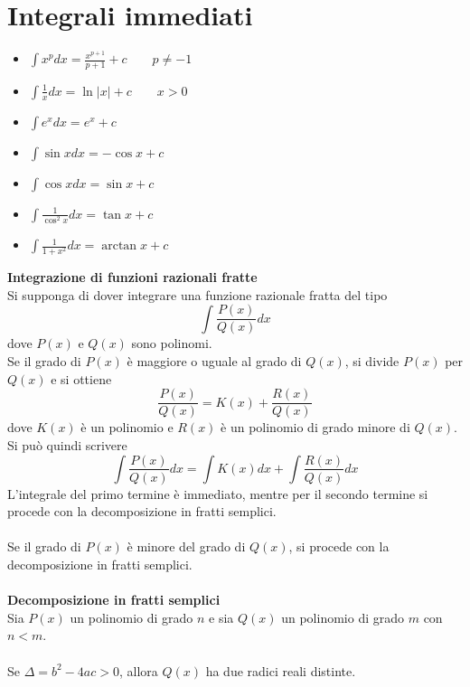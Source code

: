 \documentclass{article}
\begin{document}
\section*{Integrali immediati}
\begin{itemize}
    \item $\int x^pdx = \frac{x^{p+1}}{p+1}+c \qquad p \neq -1$
    \item $\int \frac{1}{x}dx = \ln|x|+c \qquad x>0$
    \item $\int e^xdx = e^x+c$
    \item $\int \sin xdx = -\cos x+c$
    \item $\int \cos xdx = \sin x+c$
    \item $\int \frac{1}{\cos^2x}dx = \tan x+c$
    \item $\int \frac{1}{1+x^2}dx = \arctan x+c$
\end{itemize}
\textbf{Integrazione di funzioni razionali fratte}\\
Si supponga di dover integrare una funzione razionale fratta del tipo
\begin{equation*}
    \int \frac{P(x)}{Q(x)}dx
\end{equation*}
dove $P(x)$ e $Q(x)$ sono polinomi.\\
Se il grado di $P(x)$ è maggiore o uguale al grado di $Q(x)$, si divide $P(x)$ per $Q(x)$ e si ottiene
\begin{equation*}
    \frac{P(x)}{Q(x)} = K(x) + \frac{R(x)}{Q(x)}
\end{equation*}
dove $K(x)$ è un polinomio e $R(x)$ è un polinomio di grado minore di $Q(x)$.\\
Si può quindi scrivere
\begin{equation*}
    \int \frac{P(x)}{Q(x)}dx = \int K(x)dx + \int \frac{R(x)}{Q(x)}dx
\end{equation*}
L'integrale del primo termine è immediato, mentre per il secondo termine si procede con la decomposizione in fratti semplici.\\\\
Se il grado di $P(x)$ è minore del grado di $Q(x)$, si procede con la decomposizione in fratti semplici.\\\\
\textbf{Decomposizione in fratti semplici}\\
Sia $P(x)$ un polinomio di grado $n$ e sia $Q(x)$ un polinomio di grado $m$ con $n<m$.\\\\
Se $\Delta = b^2-4ac > 0$, allora $Q(x)$ ha due radici reali distinte.\\
\end{document}
